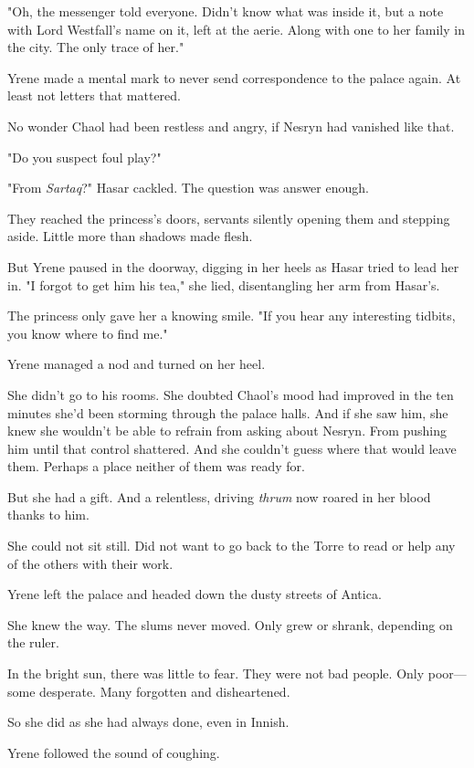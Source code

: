 "Oh, the messenger told everyone.
Didn't know what was inside it, but a note with Lord Westfall's name on it, left at the aerie.
Along with one to her family in the city.
The only trace of her."

Yrene made a mental mark to never send correspondence to the palace again.
At least not letters that mattered.

No wonder Chaol had been restless and angry, if Nesryn had vanished like that.

"Do you suspect foul play?"

"From \emph{Sartaq}?"
Hasar cackled.
The question was answer enough.

They reached the princess's doors, servants silently opening them and stepping aside.
Little more than shadows made flesh.

But Yrene paused in the doorway, digging in her heels as Hasar tried to lead her in.
"I forgot to get him his tea," she lied, disentangling her arm from Hasar's.

The princess only gave her a knowing smile.
"If you hear any interesting tidbits, you know where to find me."

Yrene managed a nod and turned on her heel.

She didn't go to his rooms.
She doubted Chaol's mood had improved in the ten minutes she'd been storming through the palace halls.
And if she saw him, she knew she wouldn't be able to refrain from asking about Nesryn.
From pushing him until that control shattered.
And she couldn't guess where that would leave them.
Perhaps a place neither of them was ready for.

But she had a gift.
And a relentless, driving \emph{thrum} now roared in her blood thanks to him.

She could not sit still.
Did not want to go back to the Torre to read or help any of the others with their work.

Yrene left the palace and headed down the dusty streets of Antica.

She knew the way.
The slums never moved.
Only grew or shrank, depending on the ruler.

In the bright sun, there was little to fear.
They were not bad people.
Only poor---some desperate.
Many forgotten and disheartened.

So she did as she had always done, even in Innish.

Yrene followed the sound of coughing.

